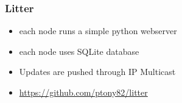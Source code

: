 \documentclass[12pt]{article}
\begin{document}
\subsubsection{Litter}
\begin{itemize}
  \item each node runs a simple python webserver
  \item each node uses SQLite database
  \item Updates are pushed through IP Multicast
  \item \url{https://github.com/ptony82/litter}
\end{itemize}
\end{document}
